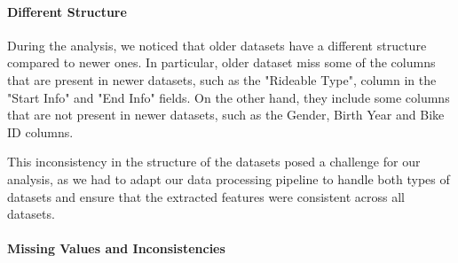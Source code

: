 \paragraph{Different Structure}
During the analysis, we noticed that older datasets have a different structure compared to newer ones.
In particular, older dataset miss some of the columns that are present in newer datasets, such as the "Rideable Type", column in the "Start Info" and "End Info" fields.
On the other hand, they include some columns that are not present in newer datasets, such as the Gender, Birth Year and Bike ID columns.

This inconsistency in the structure of the datasets posed a challenge for our analysis, as we had to adapt our data processing pipeline to handle both types of datasets and ensure that the extracted features were consistent across all datasets.

\paragraph{Missing Values and Inconsistencies}

